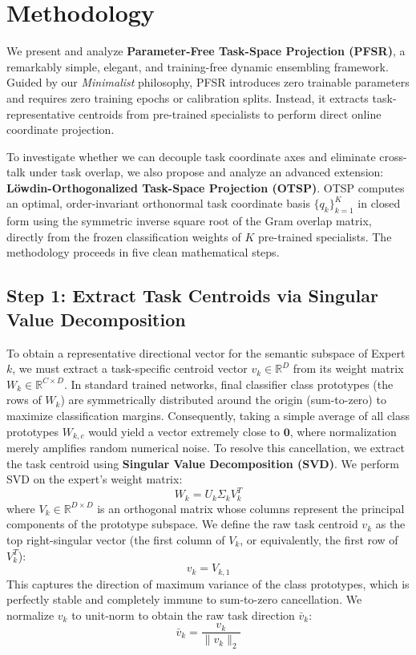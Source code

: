 \section{Methodology}
\label{sec:method}

We present and analyze \textbf{Parameter-Free Task-Space Projection (PFSR)}, a remarkably simple, elegant, and training-free dynamic ensembling framework. Guided by our \textit{Minimalist} philosophy, PFSR introduces zero trainable parameters and requires zero training epochs or calibration splits. Instead, it extracts task-representative centroids from pre-trained specialists to perform direct online coordinate projection. 

To investigate whether we can decouple task coordinate axes and eliminate cross-talk under task overlap, we also propose and analyze an advanced extension: \textbf{L{\"o}wdin-Orthogonalized Task-Space Projection (OTSP)}. OTSP computes an optimal, order-invariant orthonormal task coordinate basis $\{q_k\}_{k=1}^K$ in closed form using the symmetric inverse square root of the Gram overlap matrix, directly from the frozen classification weights of $K$ pre-trained specialists. The methodology proceeds in five clean mathematical steps.

\subsection{Step 1: Extract Task Centroids via Singular Value Decomposition}
To obtain a representative directional vector for the semantic subspace of Expert $k$, we must extract a task-specific centroid vector $v_k \in \mathbb{R}^D$ from its weight matrix $W_k \in \mathbb{R}^{C \times D}$.
In standard trained networks, final classifier class prototypes (the rows of $W_k$) are symmetrically distributed around the origin (sum-to-zero) to maximize classification margins. Consequently, taking a simple average of all class prototypes $W_{k,c}$ would yield a vector extremely close to $\mathbf{0}$, where normalization merely amplifies random numerical noise.
To resolve this cancellation, we extract the task centroid using \textbf{Singular Value Decomposition (SVD)}. We perform SVD on the expert's weight matrix:
\begin{equation}
W_k = U_k \Sigma_k V_k^T
\end{equation}
where $V_k \in \mathbb{R}^{D \times D}$ is an orthogonal matrix whose columns represent the principal components of the prototype subspace. We define the raw task centroid $v_k$ as the top right-singular vector (the first column of $V_k$, or equivalently, the first row of $V_k^T$):
\begin{equation}
v_k = V_{k, 1}
\end{equation}
This captures the direction of maximum variance of the class prototypes, which is perfectly stable and completely immune to sum-to-zero cancellation. We normalize $v_k$ to unit-norm to obtain the raw task direction $\bar{v}_k$:
\begin{equation}
\bar{v}_k = \frac{v_k}{\|v_k\|_2}
\end{equation}

